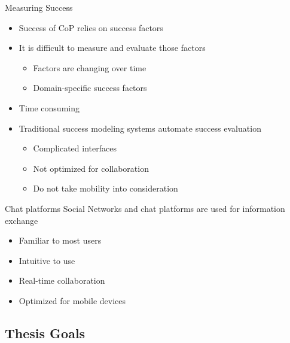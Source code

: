 \begin{frame}{Measuring Success}
  \begin{itemize}
    \item Success of CoP relies on success factors
    \item It is difficult to measure and evaluate those factors
          \begin{itemize}
            \item Factors are changing over time \cite{Renz08}
            \item Domain-specific success factors
          \end{itemize}
    \item Time consuming
    \item Traditional success modeling systems automate success evaluation
          \begin{itemize}
            \item Complicated interfaces
            \item Not optimized for collaboration
            \item Do not take mobility into consideration \cite{Renz08}
          \end{itemize}
  \end{itemize}
\end{frame}

\begin{frame}{Chat platforms}
  Social Networks and chat platforms are used for information exchange
  \begin{itemize}
    \item Familiar to most users
    \item Intuitive to use
    \item Real-time collaboration
    \item Optimized for mobile devices
  \end{itemize}
\end{frame}


\subsection{Thesis Goals}


